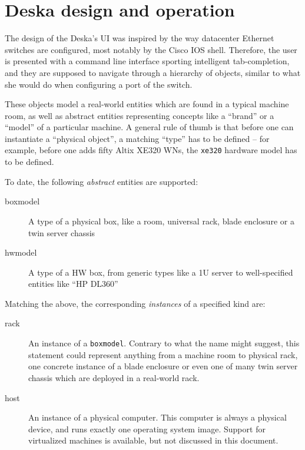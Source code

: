 \documentclass[11pt]{article}
\begin{document}
\section{Deska design and operation}

The design of the Deska's UI was inspired by the way datacenter Ethernet
switches are configured, most notably by the Cisco IOS shell.  Therefore, the
user is presented with a command line interface sporting intelligent
tab-completion, and they are supposed to navigate through a hierarchy of
objects, similar to what she would do when configuring a port of the switch.

These objects model a real-world entities which are found in a typical machine
room, as well as abstract entities representing concepts like a ``brand'' or a
``model'' of a particular machine.  A general rule of thumb is that before one
can instantiate a ``physical object'', a matching ``type'' has to be defined --
for example, before one adds fifty Altix XE320 WNs, the {\tt xe320} hardware
model has to be defined.

To date, the following {\em abstract} entities are supported:

\begin{description}
    \item[boxmodel] A type of a physical box, like a room, universal rack, blade
        enclosure or a twin server chassis
    \item[hwmodel] A type of a HW box, from generic types like a 1U server to
        well-specified entities like ``HP DL360''
\end{description}

Matching the above, the corresponding {\em instances} of a specified kind are:

\begin{description}
    \item[rack] An instance of a {\tt boxmodel}.  Contrary to what the name
        might suggest, this statement could represent anything from a machine
        room to physical rack, one concrete instance of a blade enclosure or
        even one of many twin server chassis which are deployed in a real-world
        rack.
    \item[host] An instance of a physical computer.  This computer is always a
        physical device, and runs exactly one operating system image.  Support
        for virtualized machines is available, but not discussed in this
        document.
\end{description}
\end{document}
